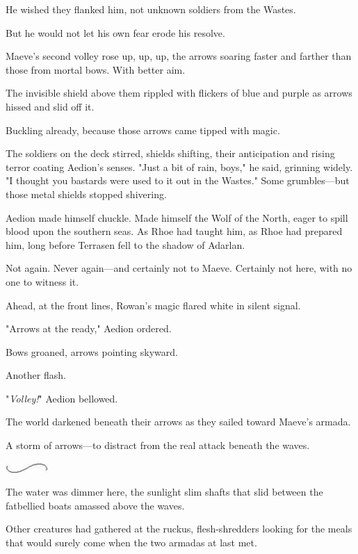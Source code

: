 He wished they flanked him, not unknown soldiers from the Wastes.

But he would not let his own fear erode his resolve.

Maeve's second volley rose up, up, up, the arrows soaring faster and farther than those from mortal bows.
With better aim.

The invisible shield above them rippled with flickers of blue and purple as arrows hissed and slid off it.

Buckling already, because those arrows came tipped with magic.

The soldiers on the deck stirred, shields shifting, their anticipation and rising terror coating Aedion's senses.
"Just a bit of rain, boys," he said, grinning widely.
"I thought you bastards were used to it out in the Wastes."
Some grumbles---but those metal shields stopped shivering.

Aedion made himself chuckle.
Made himself the Wolf of the North, eager to spill blood upon the southern seas.
As Rhoe had taught him, as Rhoe had prepared him, long before Terrasen fell to the shadow of Adarlan.

Not again.
Never again---and certainly not to Maeve.
Certainly not here, with no one to witness it.

Ahead, at the front lines, Rowan's magic flared white in silent signal.

"Arrows at the ready," Aedion ordered.

Bows groaned, arrows pointing skyward.

Another flash.

"\emph{Volley!}" Aedion bellowed.

The world darkened beneath their arrows as they sailed toward Maeve's armada.

A storm of arrows---to distract from the real attack beneath the waves.

\begin{center}
	\includegraphics[width=0.65in,height=0.13in]{images/seperator}
\end{center}

The water was dimmer here, the sunlight slim shafts that slid between the fatbellied boats amassed above the waves.

Other creatures had gathered at the ruckus, flesh-shredders looking for the meals that would surely come when the two armadas at last met.

